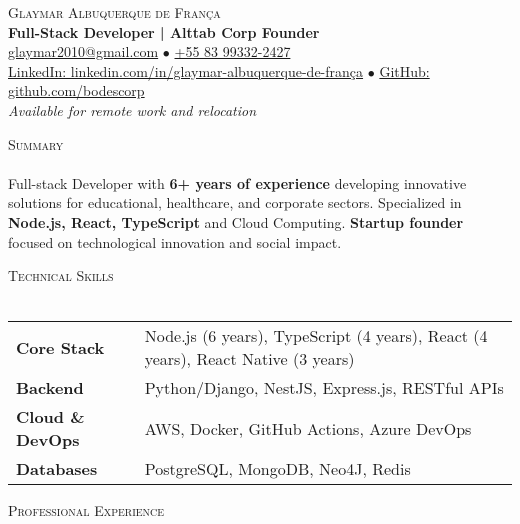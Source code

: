 \documentclass[a4paper]{article}
\newcommand{\lineunder}{
    \vspace*{-8pt} \\
    \hspace*{-18pt} \hrulefill \\
}
\newcommand{\header}[1]{
    {\hspace*{-18pt}\vspace*{6pt} \textsc{#1}}
    \vspace*{-6pt} \lineunder
}
\newcommand{\skillrow}[2]{
    \textbf{#1} & #2 \\
}
\begin{document}
\vspace*{-40pt}

%
%
\begin{center}
    {\Huge \scshape {Glaymar Albuquerque de França}}\\
    \vspace*{3pt}
    {\large \textbf{Full-Stack Developer | Alttab Corp Founder}}\\
    \vspace*{3pt}
    \href{mailto:glaymar2010@gmail.com}{glaymar2010@gmail.com} $\bullet$ \href{https://wa.me/+5583993322427}{+55 83 99332-2427} \\
    \vspace*{2pt}
    \href{https://www.linkedin.com/in/glaymar-albuquerque-de-fran\%C3\%A7a/}{LinkedIn: linkedin.com/in/glaymar-albuquerque-de-frança} $\bullet$ \href{https://github.com/bodescorp}{GitHub: github.com/bodescorp}\\
    \vspace*{3pt}
    \textit{Available for remote work and relocation} \\
\end{center}

%
%
\header{Summary}
\vspace{2mm}
Full-stack Developer with \textbf{6+ years of experience} developing innovative solutions for educational, healthcare, and corporate sectors. Specialized in \textbf{Node.js, React, TypeScript} and Cloud Computing. \textbf{Startup founder} focused on technological innovation and social impact.
\vspace{2mm}

%
%
\header{Technical Skills}
\vspace{2mm}
\begin{longtable}{p{3.5cm}p{12.5cm}}
    \skillrow{Core Stack}{Node.js (6 years), TypeScript (4 years), React (4 years), React Native (3 years)}
    \skillrow{Backend}{Python/Django, NestJS, Express.js, RESTful APIs}
    \skillrow{Cloud \& DevOps}{AWS, Docker, GitHub Actions, Azure DevOps}
    \skillrow{Databases}{PostgreSQL, MongoDB, Neo4J, Redis}
\end{longtable}
\vspace{2mm}


%
%
\header{Professional Experience}
\vspace{2mm}
\end{document}
